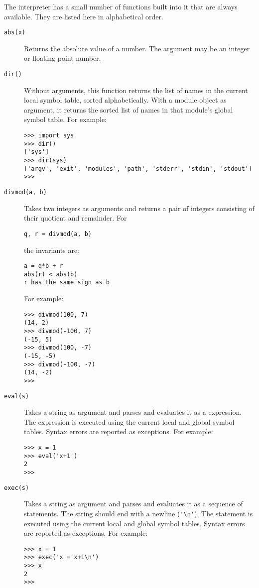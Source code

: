 The {\Python} interpreter has a small number of functions built into it that
are always available.
They are listed here in alphabetical order.
\begin{description}
\item[{\tt abs(x)}]
Returns the absolute value of a number.
The argument may be an integer or floating point number.
\item[{\tt dir()}]
Without arguments, this function returns the list of names in the
current local symbol table, sorted alphabetically.
With a module object as argument, it returns the sorted list of names in
that module's global symbol table.
For example:
\bcode\begin{verbatim}
>>> import sys
>>> dir()
['sys']
>>> dir(sys)
['argv', 'exit', 'modules', 'path', 'stderr', 'stdin', 'stdout']
>>> 
\end{verbatim}\ecode
\item[{\tt divmod(a, b)}]
Takes two integers as arguments and returns a pair of integers
consisting of their quotient and remainder.
For
\bcode\begin{verbatim}
q, r = divmod(a, b)
\end{verbatim}\ecode
the invariants are:
\bcode\begin{verbatim}
a = q*b + r
abs(r) < abs(b)
r has the same sign as b
\end{verbatim}\ecode
For example:
\bcode\begin{verbatim}
>>> divmod(100, 7)
(14, 2)
>>> divmod(-100, 7)
(-15, 5)
>>> divmod(100, -7)
(-15, -5)
>>> divmod(-100, -7)
(14, -2)
>>> 
\end{verbatim}\ecode
\item[{\tt eval(s)}]
Takes a string as argument and parses and evaluates it as a {\Python}
expression.
The expression is executed using the current local and global symbol
tables.
Syntax errors are reported as exceptions.
For example:
\bcode\begin{verbatim}
>>> x = 1
>>> eval('x+1')
2
>>> 
\end{verbatim}\ecode
\item[{\tt exec(s)}]
Takes a string as argument and parses and evaluates it as a sequence of
{\Python} statements.
The string should end with a newline (\verb"'\n'").
The statement is executed using the current local and global symbol
tables.
Syntax errors are reported as exceptions.
For example:
\bcode\begin{verbatim}
>>> x = 1
>>> exec('x = x+1\n')
>>> x
2
>>> 
\end{verbatim}\ecode

\end{description}
